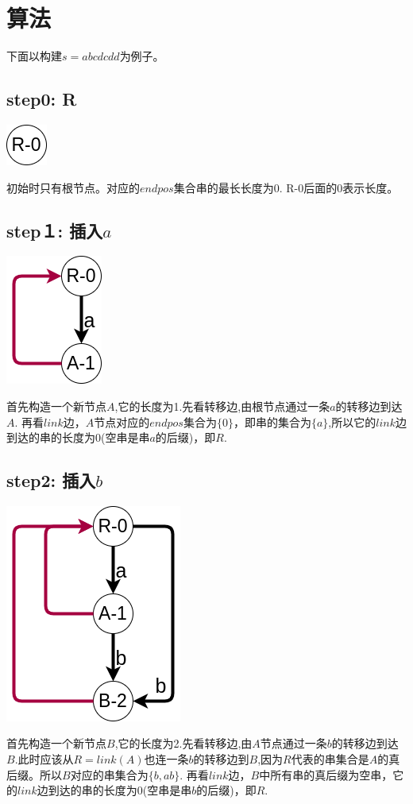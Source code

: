 \documentclass{article}
\begin{document}
\section{算法}
下面以构建$s=abcdcdd$为例子。
\subsection{step0: R}
\includegraphics[scale=0.5]{step0.png} \par
初始时只有根节点。对应的$endpos$集合串的最长长度为0. R-0后面的0表示长度。\par

\subsection{step１: 插入$a$}
\includegraphics[scale=0.5]{step1.png} \par
首先构造一个新节点$A$,它的长度为1.先看转移边,由根节点通过一条$a$的转移边到达$A$. 再看$link$边，$A$节点对应的$endpos$集合为$\{0\}$，即串的集合为$\{a\}$,所以它的$link$边到达的串的长度为0(空串是串$a$的后缀)，即$R$.\par

\subsection{step2: 插入$b$}
\includegraphics[scale=0.5]{step2.png} \par
首先构造一个新节点$B$,它的长度为2.先看转移边,由$A$节点通过一条$b$的转移边到达$B$.此时应该从$R=link(A)$也连一条$b$的转移边到$B$,因为$R$代表的串集合是$A$的真后缀。所以$B$对应的串集合为$\{b,ab\}$. 再看$link$边，$B$中所有串的真后缀为空串，它的$link$边到达的串的长度为0(空串是串$b$的后缀)，即$R$.\par
\end{document}
